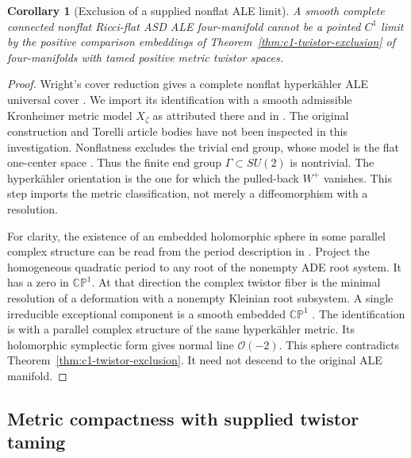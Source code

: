 \documentclass[11pt]{article}
\numberwithin{equation}{section}
\newtheorem{corollary}[theorem]{Corollary}
\theoremstyle{definition}
\theoremstyle{remark}
\newcommand{\CP}{\mathbb{CP}}
\begin{document}
\begin{corollary}[Exclusion of a supplied nonflat ALE limit]
\label{cor:c1-tamed-ale-exclusion}
A smooth complete connected nonflat Ricci-flat ASD ALE
four-manifold cannot be a pointed $C^1$ limit by the positive
comparison embeddings of Theorem~\ref{thm:c1-twistor-exclusion}
of four-manifolds with tamed positive metric twistor spaces.
\end{corollary}
\begin{proof}
Wright's cover reduction gives a complete nonflat
hyperk\"ahler ALE universal cover
\cite[Theorem~A and \S\S2--3]{Wright2012GravitationalInstantonQuotients}.
We import its identification with a smooth admissible
Kronheimer metric model $X_\zeta$ as attributed there and in
\cite[\S1.1]{LyuXu2025ALERationalCurves}.
The original construction and Torelli article bodies have
not been inspected in this investigation.
Nonflatness excludes the trivial end group, whose model is
the flat one-center space
\cite[\S\S7.1 and 8]{Wright2012GravitationalInstantonQuotients}.
Thus the finite end group $\Gamma\subset SU(2)$ is nontrivial.
The hyperk\"ahler orientation is
the one for which the pulled-back $W^+$ vanishes.
This step imports the metric classification, not merely a
diffeomorphism with a resolution.

For clarity, the existence of an embedded holomorphic sphere
in some parallel complex structure can be read from the
period description in
\cite[\S2.3, (2.3) and Corollary~2.14]{LyuXu2025ALERationalCurves}.
Project the homogeneous quadratic period to any root of
the nonempty ADE root system. It has a zero in $\CP^1$.
At that direction the complex twistor fiber is the minimal
resolution of a deformation with a nonempty Kleinian root
subsystem. A single irreducible exceptional component is a
smooth embedded $\CP^1$
\cite[\S2.1 and Lemma~2.6, Corollary~2.11]{LyuXu2025ALERationalCurves}.
The identification is with a parallel complex structure of
the same hyperk\"ahler metric. Its holomorphic symplectic
form gives normal line $\mathcal O(-2)$.
This sphere contradicts
Theorem~\ref{thm:c1-twistor-exclusion}. It need not descend
to the original ALE manifold.
\end{proof}

\subsection{Metric compactness with supplied twistor taming}
\end{document}
